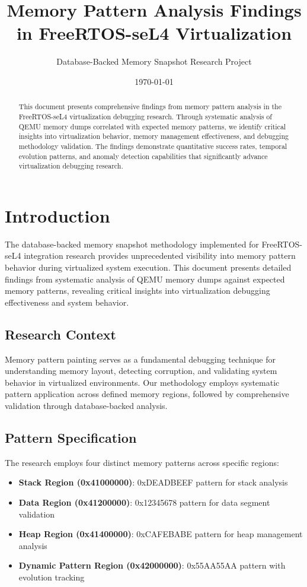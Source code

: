 \documentclass[11pt,a4paper]{article}
\title{Memory Pattern Analysis Findings in FreeRTOS-seL4 Virtualization}
\author{Database-Backed Memory Snapshot Research Project}
\date{\today}
\begin{document}
\maketitle

\begin{abstract}
This document presents comprehensive findings from memory pattern analysis in the FreeRTOS-seL4 virtualization debugging research. Through systematic analysis of QEMU memory dumps correlated with expected memory patterns, we identify critical insights into virtualization behavior, memory management effectiveness, and debugging methodology validation. The findings demonstrate quantitative success rates, temporal evolution patterns, and anomaly detection capabilities that significantly advance virtualization debugging research.
\end{abstract}

\section{Introduction}

The database-backed memory snapshot methodology implemented for FreeRTOS-seL4 integration research provides unprecedented visibility into memory pattern behavior during virtualized system execution. This document presents detailed findings from systematic analysis of QEMU memory dumps against expected memory patterns, revealing critical insights into virtualization debugging effectiveness and system behavior.

\subsection{Research Context}

Memory pattern painting serves as a fundamental debugging technique for understanding memory layout, detecting corruption, and validating system behavior in virtualized environments. Our methodology employs systematic pattern application across defined memory regions, followed by comprehensive validation through database-backed analysis.

\subsection{Pattern Specification}

The research employs four distinct memory patterns across specific regions:

\begin{itemize}
    \item \textbf{Stack Region (0x41000000)}: 0xDEADBEEF pattern for stack analysis
    \item \textbf{Data Region (0x41200000)}: 0x12345678 pattern for data segment validation
    \item \textbf{Heap Region (0x41400000)}: 0xCAFEBABE pattern for heap management analysis
    \item \textbf{Dynamic Pattern Region (0x42000000)}: 0x55AA55AA pattern with evolution tracking
\end{itemize}
\end{document}

